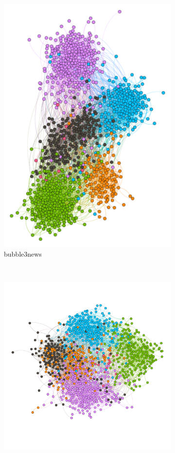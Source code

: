 \begin{figure}
\begin{subfigure}[t]{0.35\textwidth}
    \includegraphics[width=\textwidth]{img/dim5_mod.pdf}
    \caption{bubble3news}
    \label{fig:bubble5mod}
  \end{subfigure}
  ~
  \begin{subfigure}[t]{0.35\textwidth}
    \includegraphics[width=\textwidth]{img/dim7_mod.pdf}

\end{subfigure}
\end{figure}
